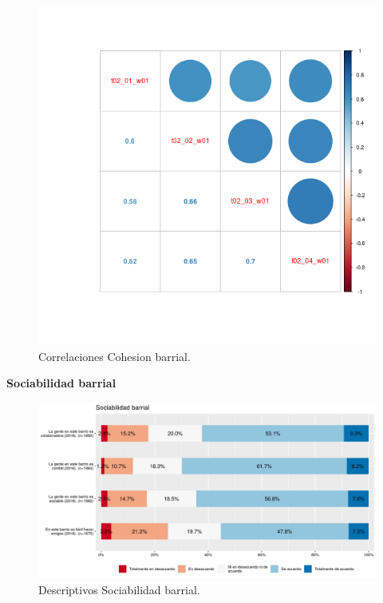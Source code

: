 \documentclass[
  12pt,
]{book}
\begin{document}
\begin{figure}[H]

{\centering \includegraphics[width=1\linewidth,height=1\textheight]{output/graphs/cohesion-barrial_cor} 

}

\caption{Correlaciones Cohesion barrial.}\label{fig:unnamed-chunk-5}
\end{figure}

\textbf{Sociabilidad barrial}

\begin{figure}[H]

{\centering \includegraphics[width=1\linewidth,height=1\textheight]{output/graphs/sociabilidad-barrial} 

}

\caption{Descriptivos Sociabilidad barrial.}\label{fig:unnamed-chunk-6}
\end{figure}
\end{document}
